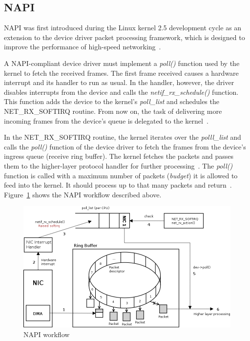 
\subsection{NAPI}\label{sub:linux-ingress-napi}
NAPI was first introduced during the Linux kernel 2.5 development cycle as
an extension to the device driver packet processing framework,
which is designed to improve the performance of high-speed networking~\cite{linux-foundation-napi}.

A NAPI-compliant device driver must implement a {\it{poll()}} function used by the kernel to fetch the received frames.
The first frame received causes a hardware interrupt and its handler to run as usual.
In the handler, however, the driver disables interrupts from the device
and calls the {\it{netif\_rx\_schedule()}} function.
This function adds the device to the kernel's {\it{poll\_list}} and schedules the NET\_RX\_SOFTIRQ routine.
From now on, the task of delivering more incoming frames from
the device's queue is delegated to the kernel~\cite{understanding-internals}.

In the NET\_RX\_SOFTIRQ routine, the kernel iterates over the {\it{polll\_list}} and calls
the {\it{poll()}} function of the device driver to fetch the frames from the device's ingress queue (receive ring buffer).
The kernel fetches the packets and passes them to the higher-layer protocol handler for further processing~\cite{linux-kernel-networking}.
The {\it{poll()}} function is called with a maximum number
of packets ({\it{budget}}) it is allowed to feed into the kernel.
It should process up to that many packets and return~\cite{reworking-napi}.
Figure~\ref{fig:linux-napi-workflow} shows the NAPI workflow described above.

\begin{figure}
	\centering
	\includegraphics[width=15cm,keepaspectratio]{fig/napi-workflow.png}
	\caption{NAPI workflow}
	\label{fig:linux-napi-workflow}
\end{figure}

